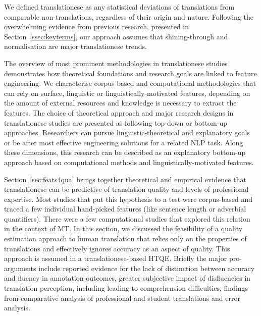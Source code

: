 We defined translationese as any statistical deviations of translations from comparable non-translations, regardless of their origin and nature. Following the overwhelming evidence from previous research, presented in Section~\ref{ssec:keyterms}, our approach assumes that shining-through and normalisation are major translationese trends. 

The overview of most prominent methodologies in translationese studies demonstrates how theoretical foundations and research goals are linked to feature engineering. We characterise corpus-based and computational methodologies that can rely on surface, linguistic or linguistically-motivated features, depending on the amount of external resources and knowledge is necessary to extract the features. The choice of theoretical approach and major research designs in translationese studies are presented as following top-down or bottom-up approaches. Researchers can pursue linguistic-theoretical and explanatory goals or be after most effective engineering solutions for a related NLP task. 
Along these dimensions, this research can be described as an explanatory bottom-up approach based on computational methods and linguistically-motivated features. 

Section~\ref{sec:feats4qua} brings together theoretical and empirical evidence that translationese can be predictive of translation quality and levels of professional expertise. Most studies that put this hypothesis to a test were corpus-based and traced a few individual hand-picked features (like sentence length or adverbial quantifiers). There were a few computational studies that explored this relation in the context of MT. In this section, we discussed the feasibility of a quality estimation approach to human translation that relies only on the properties of translations and effectively ignores accuracy as an aspect of quality. This approach is assumed in a translationese-based HTQE. Briefly the major pro-arguments include reported evidence for the lack of distinction between accuracy and fluency in annotation outcomes, greater subjective impact of disfluencies in translation perception, including leading to comprehension difficulties, findings from comparative analysis of professional and student translations and error analysis. 

